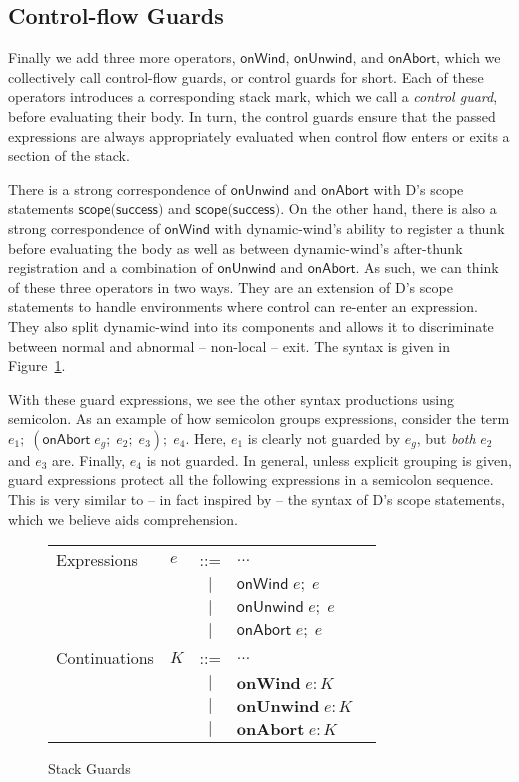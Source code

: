 \documentclass[11pt]{article}
\newcommand{\onWind}[2]{\textsf{onWind}\;#1;\;#2}
\newcommand{\onUnwind}[2]{\textsf{onUnwind}\;#1;\;#2}
\newcommand{\onAbort}[2]{\textsf{onAbort}\;#1;\;#2}
\begin{document}
\subsection{Control-flow Guards}

Finally we add three more operators, $\textsf{onWind}$, $\textsf{onUnwind}$, and $\textsf{onAbort}$, which we collectively call control-flow guards, or control guards for short.
Each of these operators introduces a corresponding stack mark, which we call a \emph{control guard}, before evaluating their body.
In turn, the control guards ensure that the passed expressions are always appropriately evaluated when control flow enters or exits a section of the stack.

There is a strong correspondence of $\textsf{onUnwind}$ and $\textsf{onAbort}$ with D's scope statements $\textsf{scope(success)}$ and $\textsf{scope(success)}$.
On the other hand, there is also a strong correspondence of $\textsf{onWind}$ with dynamic-wind's ability to register a thunk before evaluating the body as well as between dynamic-wind's after-thunk registration and a combination of $\textsf{onUnwind}$ and $\textsf{onAbort}$.
As such, we can think of these three operators in two ways.
They are an extension of D's scope statements to handle environments where control can re-enter an expression.
They also split dynamic-wind into its components and allows it to discriminate between normal and abnormal -- non-local -- exit.
The syntax is given in Figure~\ref{fig:addGuards}.

With these guard expressions, we see the other syntax productions using semicolon.
As an example of how semicolon groups expressions, consider the term $e_1;\;(\textsf{onAbort}\;e_g;\;e_2;\;e_3);\;e_4$.
Here, $e_1$ is clearly not guarded by $e_g$, but \emph{both} $e_2$ and $e_3$ are.
Finally, $e_4$ is not guarded.
In general, unless explicit grouping is given, guard expressions protect all the following expressions in a semicolon sequence.
This is very similar to -- in fact inspired by -- the syntax of D's scope statements, which we believe aids comprehension.

\begin{figure}[h!]
\caption{Stack Guards}
\label{fig:addGuards}

\begin{tabular}{llcll}
Expressions & $e$ & ::= & $\ldots$ \\
& & $|$ & $\onWind{e}{e}$ \\
& & $|$ & $\onUnwind{e}{e}$ \\
& & $|$ & $\onAbort{e}{e}$ \\
Continuations & $K$ & ::= & $\ldots$ \\
& & $|$ & $\textbf{onWind}\;e:K$ \\
& & $|$ & $\textbf{onUnwind}\;e:K$ \\
& & $|$ & $\textbf{onAbort}\;e:K$ \\
\end{tabular}
\end{figure}
\end{document}

